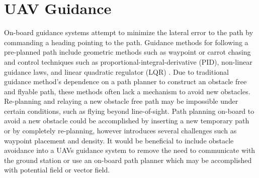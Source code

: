 \documentclass[numbered,pdftex]{ohio-etd}
\begin{document}
\section{UAV Guidance}
On-board guidance systems attempt to minimize the lateral error to the path by commanding a heading pointing to the path. Guidance methods for following a pre-planned path include geometric methods such as waypoint or carrot chasing and control techniques such as proportional-integral-derivative (PID), non-linear guidance laws, and linear quadratic regulator (LQR) \cite{sujit_unmanned_2014}. Due to traditional guidance method's dependence on a path planner to construct an obstacle free and flyable path, these methods often lack a mechanism to avoid new obstacles. Re-planning and relaying a new obstacle free path may be impossible under certain conditions, such as flying beyond line-of-sight. Path planning on-board to avoid a new obstacle could be accomplished by inserting a new temporary path or by completely re-planning, however introduces several challenges such as waypoint placement and density. It would be beneficial to include obstacle avoidance into a UAVs guidance system to remove the need to communicate with the ground station or use an on-board path planner which may be accomplished with potential field or vector field. \\
\end{document}
